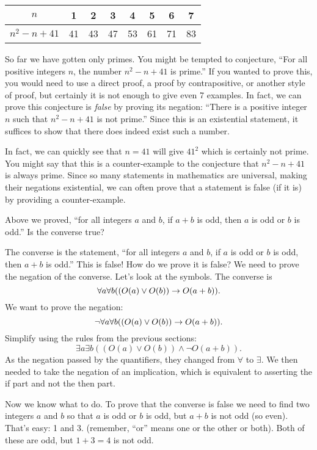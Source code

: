 \documentclass[12pt]{article}
\begin{document}
\begin{center}
\begin{tabular}{c|c|c|c|c|c|c|c}
$n$ & 1 & 2 & 3 & 4 & 5 & 6 & 7\\ \hline
$n^2 - n + 41$ & 41 & 43 & 47 & 53 & 61 & 71 & 83
 \end{tabular}
\end{center}

So far we have gotten only primes.  You might be tempted to conjecture, ``For all positive integers $n$, the number $n^2 - n + 41$ is prime.''  If you wanted to prove this, you would need to use a direct proof, a proof by contrapositive, or another style of proof, but certainly it is not enough to give even 7 examples.  In fact, we can prove this conjecture is {\em false} by proving its negation: ``There is a positive integer $n$ such that $n^2 - n + 41$ is not prime.''  Since this is an existential statement, it suffices to show that there does indeed exist such a number.

In fact, we can quickly see that $n = 41$ will give $41^2$ which is certainly not prime.  You might say that this is a counter-example to the conjecture that $n^2 - n + 41$ is always prime.  Since so many statements in mathematics are universal, making their negations existential, we can often prove that a statement is false (if it is) by providing a counter-example.

\begin{example}
     Above we proved, ``for all integers $a$ and $b$, if $a+b$ is odd, then $a$ is odd or $b$ is odd.''  Is the converse true?
     
     \begin{solution}
     The converse is the statement, ``for all integers $a$ and $b$, if $a$ is odd or $b$ is odd, then $a + b$ is odd.''  This is false!  How do we prove it is false?  We need to prove the negation of the converse.  Let's look at the symbols.  The converse is
          \[\forall a \forall b ((O(a) \vee O(b)) \rightarrow O(a+b)).\]
          We want to prove the negation:
          \[\neg \forall a \forall b ((O(a) \vee O(b)) \rightarrow O(a+b)).\]
          Simplify using the rules from the previous sections:
          \[\exists a \exists b ((O(a) \vee O(b)) \wedge \neg O(a+b)).\]
          As the negation passed by the quantifiers, they changed from $\forall$ to $\exists$.  We then needed to take the negation of an implication, which is equivalent to asserting the if part and not the then part.  
          
          Now we know what to do.  To prove that the converse is false we need to find two integers $a$ and $b$ so that $a$ is odd or $b$ is odd, but $a+b$ is not odd (so even).  That's easy: 1 and 3.  (remember, ``or'' means one or the other or both).  Both of these are odd, but $1+3 = 4$ is not odd.
     \end{solution}
     
\end{example}
 
\end{document}

